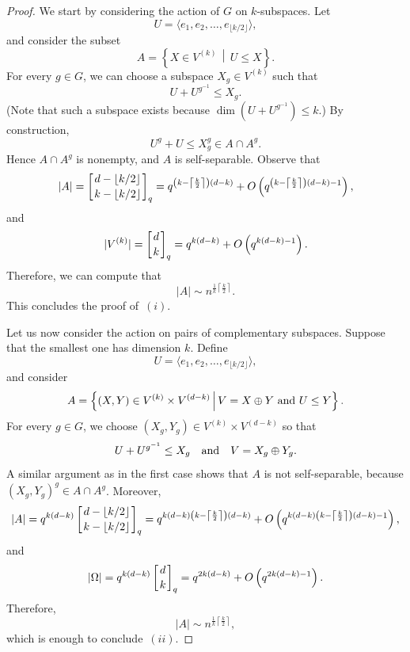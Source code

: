 \documentclass[a4paper]{amsart}
\theoremstyle{definition}
\begin{document}
\begin{proof}
    We start by considering the action of $G$ on $k$-subspaces. Let
    \[U = \langle e_1,e_2,\ldots, e_{\lfloor k/2 \rfloor} \rangle ,\]
    and consider the subset
    $$A = \left\{ X \in V^{(k)} \,\middle\vert\,  U \leq X\right\}.$$
    For every $g\in G$, we can choose a subspace $X_g \in V^{(k)}$ such that
    \[ U + U^{g^{-1}} \leq X_g. \]
    (Note that such a subspace exists because $\dim (U + U^{g^{-1}}) \le k$.)
    By construction,
    \[ U^g + U \le X_g^g \in A \cap A^g .\]
    Hence $A\cap A^g$ is nonempty, and $A$ is self-separable.
    Observe that
    \[|A| = \left[ d-\lfloor k/2\rfloor \atop k-\lfloor k/2\rfloor\right]_q = q^{\left(k - \left\lceil\frac{k}{2}\right\rceil \right)(d-k)} + O\left( q^{\left(k - \left\lceil\frac{k}{2}\right\rceil \right)(d-k) -1}\right) ,\]
    and
    \[|V^{(k)}|=\left[ d \atop k \right]_q = q^{k(d-k)} + O\left( q^{k(d-k) -1}\right). \]
    Therefore, we can compute that
    \[ |A| \sim n^{\frac{1}{k} \left\lceil \frac{k}{2}\right\rceil} .\]
    This concludes the proof of~$(i)$.

    Let us now consider the action on pairs of complementary subspaces. Suppose that the smallest one has dimension $k$. Define
    \[ U = \langle e_1,e_2,\ldots, e_{\lfloor k/2 \rfloor} \rangle ,\]
    and consider
    $$A = \left\{ (X,Y) \in V^{(k)}\times V^{(d-k)} \,\middle\vert\,  V= X \oplus Y \hbox{ and } U \leq Y\right\}.$$
    For every $g\in G$, we choose $(X_g,Y_g) \in V^{(k)}\times V^{(d-k)}$ so that
    \[ U + U^{g^{-1}} \le X_g  \quad \hbox{and}  \quad V= X_g \oplus Y_g .\]
    A similar argument as in the first case shows that $A$ is not self-separable, because $(X_g,Y_g)^g \in A \cap A^g$. Moreover,
    \[|A| = q^{k(d-k)} \left[ d-\lfloor k/2\rfloor \atop k-\lfloor k/2\rfloor\right]_q = q^{k(d-k)\left(k - \left\lceil\frac{k}{2}\right\rceil \right)(d-k)} + O\left( q^{k(d-k)\left(k - \left\lceil\frac{k}{2}\right\rceil \right)(d-k) -1}\right) ,\]
    and
    \[|\Omega| = q^{k(d-k)}\left[ d \atop k \right]_q = q^{2k(d-k)} + O\left( q^{2k(d-k) -1}\right). \]
    Therefore,
    \[ |A| \sim n^{\frac{1}{k} \left\lceil \frac{k}{2}\right\rceil} ,\]
    which is enough to conclude~$(ii)$.


\end{proof}
\end{document}
